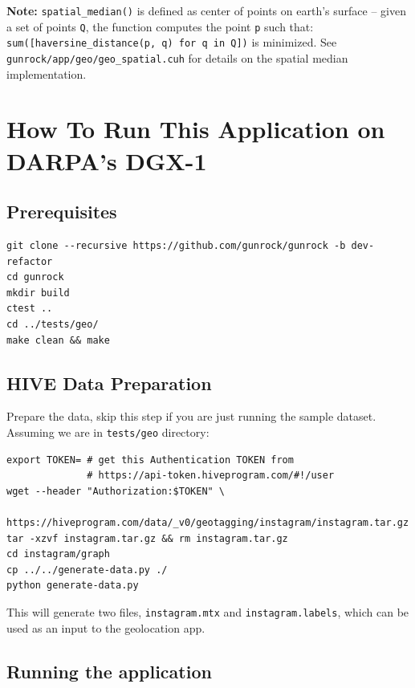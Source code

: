 \documentclass[10pt,oneside]{memoir}
\begin{document}
\textbf{Note:} \texttt{spatial\_median()} is defined as center of points
on earth's surface -- given a set of points \texttt{Q}, the function
computes the point \texttt{p} such that:
\texttt{sum({[}haversine\_distance(p,\ q)\ for\ q\ in\ Q{]})} is
minimized. See \texttt{gunrock/app/geo/geo\_spatial.cuh} for details on
the spatial median implementation.

\hypertarget{how-to-run-this-application-on-darpas-dgx-1-1}{%
\section{How To Run This Application on DARPA's
DGX-1}\label{how-to-run-this-application-on-darpas-dgx-1-1}}

\hypertarget{prerequisites}{%
\subsection{Prerequisites}\label{prerequisites}}

\begin{verbatim}
git clone --recursive https://github.com/gunrock/gunrock -b dev-refactor
cd gunrock
mkdir build
ctest ..
cd ../tests/geo/
make clean && make
\end{verbatim}

\hypertarget{hive-data-preparation}{%
\subsection{HIVE Data Preparation}\label{hive-data-preparation}}

Prepare the data, skip this step if you are just running the sample
dataset. Assuming we are in \texttt{tests/geo} directory:

\begin{verbatim}
export TOKEN= # get this Authentication TOKEN from
              # https://api-token.hiveprogram.com/#!/user
wget --header "Authorization:$TOKEN" \
  https://hiveprogram.com/data/_v0/geotagging/instagram/instagram.tar.gz
tar -xzvf instagram.tar.gz && rm instagram.tar.gz
cd instagram/graph
cp ../../generate-data.py ./
python generate-data.py
\end{verbatim}

This will generate two files, \texttt{instagram.mtx} and
\texttt{instagram.labels}, which can be used as an input to the
geolocation app.

\hypertarget{running-the-application-1}{%
\subsection{Running the application}\label{running-the-application-1}}
\end{document}
